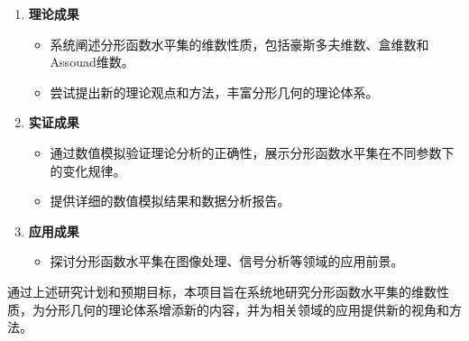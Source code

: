 \begin{enumerate}
      \item \textbf{理论成果}
      \begin{itemize}
            \item 系统阐述分形函数水平集的维数性质，包括豪斯多夫维数、盒维数和Assouad维数。
            \item 尝试提出新的理论观点和方法，丰富分形几何的理论体系。
      \end{itemize}
      \item \textbf{实证成果}
      \begin{itemize}
            \item 通过数值模拟验证理论分析的正确性，展示分形函数水平集在不同参数下的变化规律。
            \item 提供详细的数值模拟结果和数据分析报告。
      \end{itemize}
      \item \textbf{应用成果}
      \begin{itemize}
            \item 探讨分形函数水平集在图像处理、信号分析等领域的应用前景。
      \end{itemize}
\end{enumerate}

通过上述研究计划和预期目标，本项目旨在系统地研究分形函数水平集的维数性质，为分形几何的理论体系增添新的内容，并为相关领域的应用提供新的视角和方法。